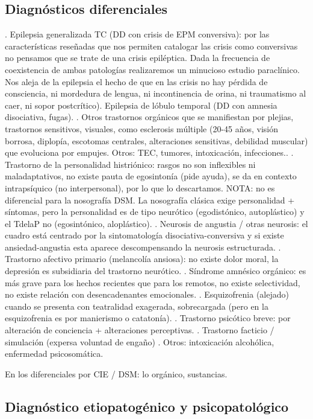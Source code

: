 \subsection*{Diagnósticos diferenciales}
. Epilepsia generalizada TC (DD con crisis de EPM conversiva): por las características reseñadas que nos permiten catalogar las crisis como conversivas no pensamos que se trate de una crisis epiléptica. Dada la frecuencia de coexistencia de ambas patologías realizaremos un minucioso estudio paraclínico. Nos aleja de la epilepsia el hecho de que en las crisis no hay pérdida de consciencia, ni mordedura de lengua, ni incontinencia de orina, ni traumatismo al caer, ni sopor postcrítico). Epilepsia de lóbulo temporal (DD con amnesia disociativa, fugas).
. Otros trastornos orgánicos que se manifiestan por plejias, trastornos sensitivos, visuales, como esclerosis múltiple (20-45 años, visión borrosa, diplopía, escotomas centrales, alteraciones sensitivas, debilidad muscular) que evoluciona por empujes. Otros: TEC, tumores, intoxicación, infecciones..
. Trastorno de la personalidad histriónico: rasgos no son inflexibles ni maladaptativos, no existe pauta de egosintonía (pide ayuda), se da en contexto intrapsíquico (no interpersonal), por lo que lo descartamos. NOTA: no es diferencial para la nosografía DSM. La nosografía clásica exige personalidad + síntomas, pero la personalidad es de tipo neurótico (egodistónico, autoplástico) y el TdelaP no (egosintónico, aloplástico).
. Neurosis de angustia / otras neurosis: el cuadro está centrado por la sintomatología disociativa-conversiva y si existe ansiedad-angustia esta aparece descompensando la neurosis estructurada.
. Trastorno afectivo primario (melancolía ansiosa): no existe dolor moral, la depresión es subsidiaria del trastorno neurótico.
. Síndrome amnésico orgánico: es más grave para los hechos recientes que para los remotos, no existe selectividad, no existe relación con desencadenantes emocionales.
. Esquizofrenia (alejado) cuando se presenta con teatralidad exagerada, sobrecargada (pero en la esquizofrenia es por manierismo o catatonía).
. Trastorno psicótico breve: por alteración de conciencia + alteraciones perceptivas.
. Trastorno facticio / simulación (expersa voluntad de engaño)
. Otros: intoxicación alcohólica, enfermedad psicosomática.

En los diferenciales por CIE / DSM: lo orgánico, sustancias.

\subsection*{Diagnóstico etiopatogénico y psicopatológico}

